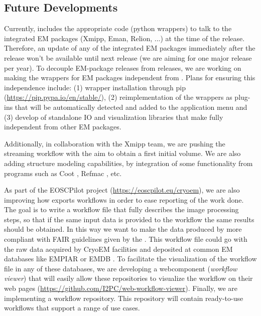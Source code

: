 \subsection{Future Developments}

Currently, \scipion includes the appropriate code (python wrappers) to talk to the integrated EM packages (Xmipp, Eman, Relion, ...) at the time of the release. Therefore, an update of any of the integrated EM packages immediately after the \scipion release won't be available until next \scipion release (we are aiming for one major release per year). To decouple EM-package releases from \scipion releases, we are working on making the wrappers for EM packages  independent from \scipion. Plans for ensuring this independence include: (1) wrapper installation through pip (\url{https://pip.pypa.io/en/stable/}), (2) reimplementation of the wrappers as plug-ins that will be automatically detected and added to the application menu and (3) develop of standalone IO  and visualization libraries that make \scipion fully independent from other EM packages.

Additionally, in collaboration with the Xmipp team, we are pushing the streaming workflow with the aim to obtain a first initial volume. We are also adding structure modeling capabilities, by integration of some functionality from programs such as Coot \citep{emsley2010:coot}, Refmac \citep{Murshudov1997:refmac}, etc. 

As part of the EOSCPilot project (\url{https://eoscpilot.eu/cryoem}), we are also improving  how \scipion exports workflows in order to ease reporting of the work done. The goal is to write a workflow file that fully describes the image processing steps, so that if the same input data is provided to the workflow the same results should be obtained. In this way we want to make  the data produced by \scipion more compliant with FAIR guidelines given by the \citet{eu2016:fair}. This workflow file could go with the raw data acquired by CryoEM facilities and deposited at common EM databases like EMPIAR or EMDB \citep{Patwardhan2016:databasesEM}. To facilitate the visualization of the workflow file in any of these databases, we are  developing a  webcomponent (\scipion \emph{workflow viewer}) that will easily allow these repositories to visualize the workflow on their web pages (\url{https://github.com/I2PC/web-workflow-viewer}). Finally, we are implementing a workflow repository. This repository will contain ready-to-use workflows that support a range of use cases.
